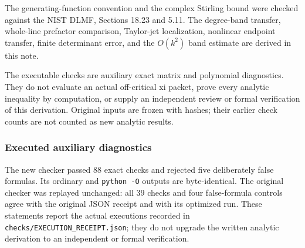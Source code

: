 The generating-function convention and the complex Stirling bound were checked against the NIST DLMF, Sections 18.23 and 5.11. The degree-band transfer, whole-line prefactor comparison, Taylor-jet localization, nonlinear endpoint transfer, finite determinant error, and the \(O(k^2)\) band estimate are derived in this note.

The executable checks are auxiliary exact matrix and polynomial diagnostics. They do not evaluate an actual off-critical xi packet, prove every analytic inequality by computation, or supply an independent review or formal verification of this derivation. Original inputs are frozen with hashes; their earlier check counts are not counted as new analytic results.

\subsubsection{Executed auxiliary diagnostics}\label{executed-auxiliary-diagnostics}

The new checker passed 88 exact checks and rejected five deliberately false formulas. Its ordinary and \texttt{python\ -O} outputs are byte-identical. The original checker was replayed unchanged: all 39 checks and four false-formula controls agree with the original JSON receipt and with its optimized run. These statements report the actual executions recorded in \texttt{checks/EXECUTION\_RECEIPT.json}; they do not upgrade the written analytic derivation to an independent or formal verification.
